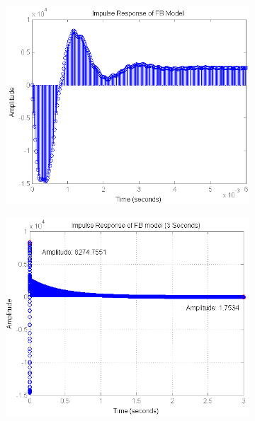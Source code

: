 \begin{figure}[h]
\centering
\begin{subfigure}[b]{0.5\textwidth}
\includegraphics[width=1.0\textwidth]{pics/impulse_FB}
\caption{}
\label{pic:}
\end{subfigure}\;\begin{subfigure}[b]{0.5\textwidth}
\includegraphics[width=1.0\textwidth]{pics/impulse_FB_3sec}
\caption{}
\label{pic:}
\end{subfigure}

\end{figure}

